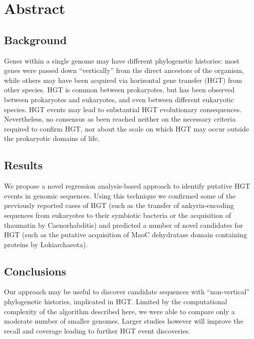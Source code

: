 \section{Abstract}
\label{abstract}
\subsection{Background}
Genes within a single genome may have different phylogenetic histories: most
genes were passed down ``vertically'' from the direct ancestors of the
organism, while others may have been acquired via horizontal gene transfer
(HGT) from other species. HGT is common between prokaryotes, but has been
observed between prokaryotes and eukaryotes, and even between different
eukaryotic species. HGT events may lead to substantial HGT evolutionary
consequences. 
Nevertheless, no consensus as been reached neither on the necessary criteria
required to confirm HGT, nor about the scale on which HGT may occur outside the
prokaryotic domains of life.
\subsection{Results}
We propose a novel regression analysis-based approach to identify putative HGT
events in genomic sequences. Using this technique we confirmed  some of the previously
reported cases of HGT (such as the transfer of ankyrin-encoding sequences from
eukaryotes to their symbiotic bacteria or the acquisition
of thaumatin by Caenorhabditis) and predicted a number of novel candidates for
HGT (such as the putative acquisition of MaoC dehydratase domain containing
proteins by Lokiarchaeota).
\subsection{Conclusions}
Our approach may be useful to discover candidate sequences with
``non-vertical'' phylogenetic histories, implicated in HGT.
Limited by the computational complexity of the algorithm described here, we
were able to compare only a moderate number of smaller genomes. Larger studies
however will improve the recall and coverage leading to further HGT event
discoveries.
